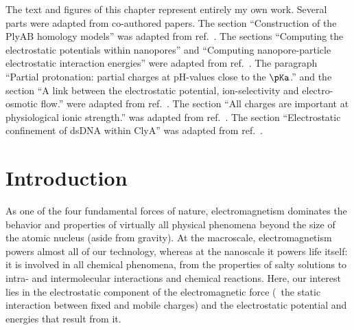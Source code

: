%
The text and figures of this chapter represent entirely my own work. Several parts were adapted from
co-authored papers.
%
The section
%
``Construction of the PlyAB homology models''
%
was adapted from ref.~\cite{Huang-2020}.
%
%
The sections
%
``Computing the electrostatic potentials within nanopores''
%
and
%
``Computing nanopore-particle electrostatic interaction energies''
%
were adapted from ref.~\cite{Willems-Ruic-Biesemans-2019}.
%
%
The paragraph
%
``Partial protonation: partial charges at pH-values close to the $\pKa$.''
%
and the section
%
``A link between the electrostatic potential, ion-selectivity and electro-osmotic flow.''
%
were adapted from ref.~\cite{Huang-2017}.
%
The section
%
``All charges are important at physiological ionic strength.''
%
was adapted from ref.~\cite{Franceschini-2016}.
%
%
The section
%
``Electrostatic confinement of {dsDNA} within {ClyA}''
%
was adapted from ref.~\cite{Bayoumi-2020}.
%

%
%
%
%





%
\section{Introduction}
%
\label{sec:elec:intro}
%

As one of the four fundamental forces of nature, electromagnetism dominates the behavior and properties of
virtually all physical phenomena beyond the size of the atomic nucleus (aside from gravity). At the
macroscale, electromagnetism powers almost all of our technology, whereas at the nanoscale it powers life
itself: it is involved in all chemical phenomena, from the properties of salty solutions to intra- and
intermolecular interactions and chemical reactions. Here, our interest lies in the electrostatic component
of the electromagnetic force (\ie~the static interaction between fixed and mobile charges) and the
electrostatic potential and energies that result from it.

